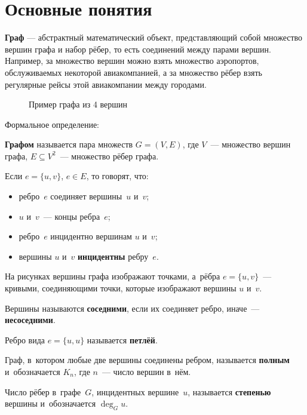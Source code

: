 \section{Основные понятия}
\textbf{Граф} — абстрактный математический объект, представляющий собой множество вершин графа и набор рёбер, то есть соединений между парами вершин. Например, за множество вершин можно взять множество аэропортов, обслуживаемых некоторой авиакомпанией, а за множество рёбер взять регулярные рейсы этой авиакомпании между городами.

\begin{figure}
	\begin{center}
	\end{center}
	\caption{Пример графа из 4 вершин}
\end{figure}

Формальное определение:

\textbf{Графом} называется пара множеств $G = (V, E)$, где $V$~--- множество вершин графа, $E \subseteq V^2$~--- множество рёбер графа.

Если $e = \{ u, v \}$, $e \in E$, то говорят, что:
\begin{itemize}
	\item ребро~$e$ соединяет вершины~$u$ и~$v$;
	\item $u$ и~$v$~--- концы ребра~$e$;
	\item ребро~$e$ инцидентно вершинам $u$ и~$v$;
	\item вершины $u$ и~$v$ \textbf{инцидентны} ребру~$e$.
\end{itemize}

На рисунках вершины графа изображают точками, а~рёбра $e = \{ u, v \}$~--- кривыми, соединяющими точки, которые изображают вершины $u$ и~$v$.

Вершины называются \textbf{соседними}, если их соединяет ребро, иначе~--- \textbf{несоседними}.

Ребро вида $e = \{ u, u \}$ называется \textbf{петлёй}.

Граф, в~котором любые две вершины соединены ребром, называется \textbf{полным} и~обозначается $K_n$, где $n$~--- число вершин в~нём.

Число рёбер в~графе~$G$, инцидентных вершине~$u$, называется \textbf{степенью} вершины и~обозначается $\deg_G u$.



